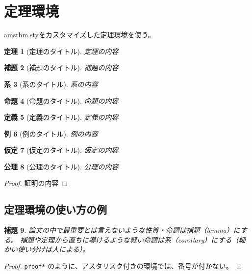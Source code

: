 \documentclass[uplatex]{sumiilab-paper}
\theoremstyle{mystyle}
\newtheorem{definition}{定義}
\newtheorem{theorem}[definition]{定理}
\newtheorem{corollary}[definition]{系}
\newtheorem{proposition}[definition]{命題}
\newtheorem{lemma}[definition]{補題}
\newtheorem{example}[definition]{例}
\newtheorem{assumption}[definition]{仮定}
\newtheorem{axiom}[definition]{公理}
\numberwithin{definition}{chapter} %
\begin{document}
\section{定理環境}

amsthm.styをカスタマイズした定理環境を使う。

\begin{theorem}[定理のタイトル]
  定理の内容
\end{theorem}

\begin{lemma}[補題のタイトル]
  補題の内容
\end{lemma}

\begin{corollary}[系のタイトル]
  系の内容
\end{corollary}

\begin{proposition}[命題のタイトル]
  命題の内容
\end{proposition}

\begin{definition}[定義のタイトル]
  定義の内容
\end{definition}

\begin{example}[例のタイトル]
  例の内容
\end{example}

\begin{assumption}[仮定のタイトル]
  仮定の内容
\end{assumption}

\begin{axiom}[公理のタイトル]
  公理の内容
\end{axiom}

\begin{proof}
  証明の内容
\end{proof}

\subsection{定理環境の使い方の例}
\label{ss:example-theorem}

\begin{lemma}
  \label{lem:interesting-lemma}
  論文の中で最重要とは言えないような性質・命題は補題（lemma）にする。
  補題や定理から直ちに導けるような軽い命題は系（corollary）にする（細かい使い分けは人による）。
\end{lemma}

\begin{proof}
  \lstinline|proof*| のように、アスタリスク付きの環境では、番号が付かない。
\end{proof}
\end{document}
